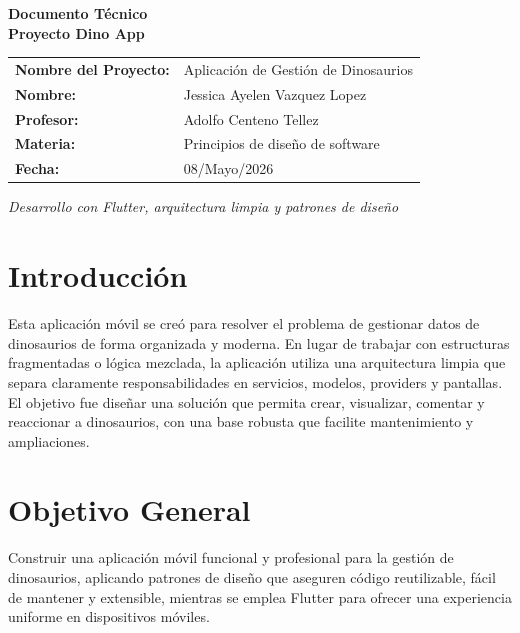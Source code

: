 \documentclass[12pt,a4paper]{article}
\begin{document}
\begin{titlepage}
    \begin{center}
        \vspace*{1.5cm}
        {\Huge\bfseries\textcolor{dinoGreen}{Documento Técnico}}\\[1.5em]
        {\LARGE\bfseries Proyecto Dino App}\\[2.5em]
        \begin{tcolorbox}[colback=dinoLight,colframe=dinoGreen,width=\textwidth,boxrule=0.8pt]
            \vspace{0.3cm}
            \begin{tabular}{ll}
                \textbf{Nombre del Proyecto:} & Aplicación de Gestión de Dinosaurios \\
                \textbf{Nombre:} & Jessica Ayelen Vazquez Lopez \\
                \textbf{Profesor:} & Adolfo Centeno Tellez \\
                \textbf{Materia:} & Principios de diseño de software \\
                \textbf{Fecha:} & 08/Mayo/2026 \\
            \end{tabular}
            \vspace{0.3cm}
        \end{tcolorbox}
        \vfill
        {\large\textit{Desarrollo con Flutter, arquitectura limpia y patrones de diseño}}\\[1em]
        \vfill
    \end{center}
\end{titlepage}

\clearpage
\tableofcontents
\clearpage

\section{Introducción}
Esta aplicación móvil se creó para resolver el problema de gestionar datos de dinosaurios de forma organizada y moderna. En lugar de trabajar con estructuras fragmentadas o lógica mezclada, la aplicación utiliza una arquitectura limpia que separa claramente responsabilidades en servicios, modelos, providers y pantallas. El objetivo fue diseñar una solución que permita crear, visualizar, comentar y reaccionar a dinosaurios, con una base robusta que facilite mantenimiento y ampliaciones.

\section{Objetivo General}
Construir una aplicación móvil funcional y profesional para la gestión de dinosaurios, aplicando patrones de diseño que aseguren código reutilizable, fácil de mantener y extensible, mientras se emplea Flutter para ofrecer una experiencia uniforme en dispositivos móviles.
\end{document}
